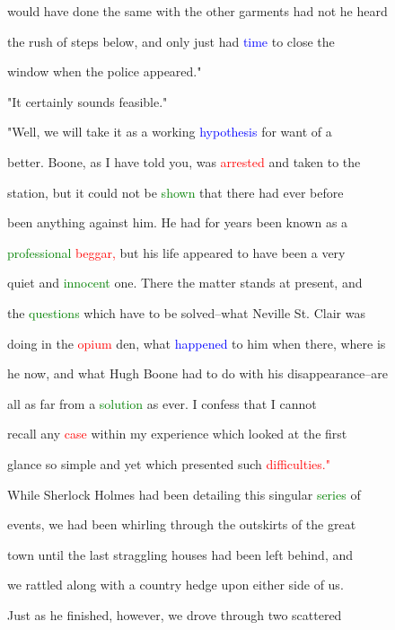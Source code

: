  would have done the same with the other garments had not he heard

 the rush of steps below, and only just had \textcolor{blue}{time} to close the

 window when the \textcolor{BurntOrange}{police} appeared."



 "It certainly sounds feasible."



 "Well, we will take it as a working \textcolor{blue}{hypothesis} for want of a

 better. Boone, as I have told you, was \textcolor{red}{arrested} and taken to the

 station, but it could not be \textcolor{green}{shown} that there had ever before

 been anything against him. He had for years been known as a

 \textcolor{green}{professional} \textcolor{red}{beggar,} but his life appeared to have been a very

 \textcolor{BurntOrange}{quiet} and \textcolor{green}{innocent} one. There the matter stands at \textcolor{BurntOrange}{present,} and

 the \textcolor{green}{questions} which have to be solved--what Neville St. Clair was

 doing in the \textcolor{red}{opium} den, what \textcolor{blue}{happened} to him when there, where is

 he now, and what Hugh Boone had to do with his disappearance--are

 all as far from a \textcolor{green}{solution} as ever. I \textcolor{BurntOrange}{confess} that I cannot

 recall any \textcolor{red}{case} within my experience which looked at the first

 glance so simple and yet which \textcolor{BurntOrange}{presented} such \textcolor{red}{difficulties."}



 While Sherlock Holmes had been detailing this singular \textcolor{green}{series} of

 events, we had been whirling through the outskirts of the great

 town until the last straggling houses had been left behind, and

 we rattled along with a country hedge upon either side of us.

 Just as he finished, however, we drove through two scattered

